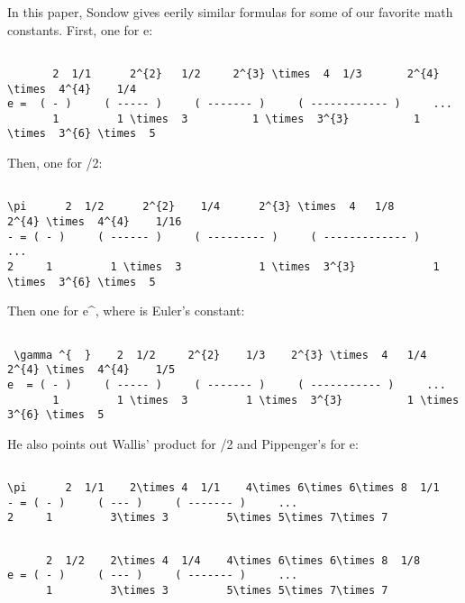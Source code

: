 In this paper, Sondow gives eerily similar formulas for some of
our favorite math constants.  First, one for e:



\begin{verbatim}

       2  1/1      2^{2}   1/2     2^{3} \times  4  1/3       2^{4} \times  4^{4}    1/4
e =  ( - )     ( ----- )     ( ------- )     ( ------------ )     ...
       1         1 \times  3          1 \times  3^{3}          1 \times  3^{6} \times  5
\end{verbatim}
    
Then, one for \pi /2:



\begin{verbatim}

\pi      2  1/2      2^{2}    1/4      2^{3} \times  4   1/8        2^{4} \times  4^{4}    1/16
- = ( - )     ( ------ )     ( --------- )     ( ------------- )     ...
2     1         1 \times  3            1 \times  3^{3}            1 \times  3^{6} \times  5
\end{verbatim}
    

Then one for e^{\gamma }, where \gamma  is Euler's constant:

 

\begin{verbatim}

 \gamma ^{  }    2  1/2     2^{2}    1/3    2^{3} \times  4   1/4      2^{4} \times  4^{4}    1/5
e  = ( - )     ( ----- )     ( ------- )     ( ----------- )     ...
       1         1 \times  3         1 \times  3^{3}          1 \times  3^{6} \times  5
\end{verbatim}
    

He also points out Wallis' product for \pi /2 and Pippenger's for e:



\begin{verbatim}

\pi      2  1/1    2\times 4  1/1    4\times 6\times 6\times 8  1/1
- = ( - )     ( --- )     ( ------- )     ...
2     1         3\times 3         5\times 5\times 7\times 7
\end{verbatim}
    


\begin{verbatim}

      2  1/2    2\times 4  1/4    4\times 6\times 6\times 8  1/8
e = ( - )     ( --- )     ( ------- )     ...
      1         3\times 3         5\times 5\times 7\times 7
\end{verbatim}
    

